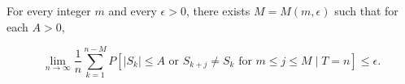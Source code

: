 For every integer $m$ and every $\epsilon > 0$, there exists $M = M(m,\epsilon)$ such that for each $A > 0$,

$$\lim_{n \to \infty} \frac{1}{n} \sum_{k=1}^{n-M} P\left[|S_k| \leq A \text{ or } S_{k+j} \neq S_k \text{ for } m \leq j \leq M \mid T = n\right] \leq \epsilon.$$

